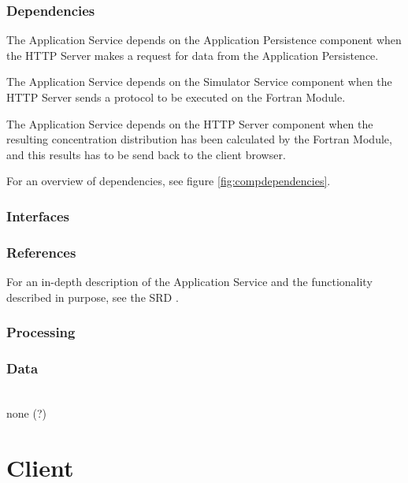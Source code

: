 \subsubsection*{Dependencies}
\begin{description}
\item The Application Service depends on the Application Persistence component when the HTTP Server makes a request for data from the Application Persistence.
\item The Application Service depends on the Simulator Service component when the HTTP Server sends a protocol to be executed on the Fortran Module.
\item The Application Service depends on the HTTP Server component when the resulting concentration distribution has been calculated by the Fortran Module, and this results has to be send back to the client browser.
\end{description}
\noindent For an overview of dependencies, see figure \ref{fig:compdependencies}.

\subsubsection*{Interfaces}

\subsubsection*{References}
For an in-depth description of the Application Service and the functionality described in purpose, see the SRD \cite{srd}.

\subsubsection*{Processing}

\subsubsection*{Data}
\\
none (?)

\section{Client}
